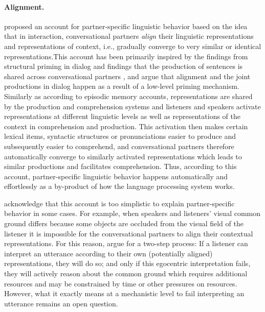 \paragraph{Alignment.} \textcite{Pickering2004} proposed an account for partner-specific linguistic behavior based on the idea
that in interaction, conversational partners \textit{align} their linguistic representations and representations of context, i.e., gradually converge to very similar or identical 
representations.This account has been primarily inspired by the findings from structural priming in dialog  and findings that the production
of sentences is shared across conversational partners , and \textcite{Pickering2004} argue that alignment and the joint productions in dialog happen
as a result of a low-level priming mechanism. Similarly as according to episodic memory accounts, representations are shared by the production and comprehension systems and 
listeners and speakers activate representations at different linguistic levels as well as 
representations of the context in comprehension and production. This activation then makes certain lexical items, syntactic structures or pronunciations easier to produce 
and subsequently easier to comprehend, and conversational partners therefore automatically 
converge to similarly activated representations which leads to similar productions and facilitates comprehension. Thus, according to this account, partner-specific linguistic behavior 
happens automatically and effortlessly as a by-product of how the language processing system works.


\textcite{Pickering2004} acknowledge that this account is too simplistic to explain partner-specific behavior in some cases.
For example, when speakers and listeners' visual common ground differs because some objects are occluded from the visual field
of the listener \parencite[as in experiments by, e.g.,][]{Keysar2000,Heller2008} it is impossible for the conversational partners to align their
contextual representations. For this reason, \textcite{Pickering2004} argue for a two-step process: If a listener can interpret 
an utterance according to their own (potentially aligned) representations, they will do so; and only if this egocentric interpretation
fails, they will actively reason about the common ground which requires additional resources and may be constrained by time or
other pressures on resources. However, what it exactly means at a mechanistic level to fail interpreting an utterance remains an open
question.

